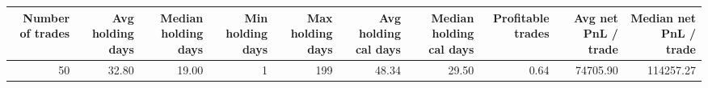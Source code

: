 \begin{tabular}{rrrrrrrrrr}
\toprule
Number of trades & Avg holding days & Median holding days & Min holding days & Max holding days & Avg holding cal days & Median holding cal days & Profitable trades & Avg net PnL / trade & Median net PnL / trade \\
\midrule
50 & 32.80 & 19.00 & 1 & 199 & 48.34 & 29.50 & 0.64 & 74705.90 & 114257.27 \\
\bottomrule
\end{tabular}
